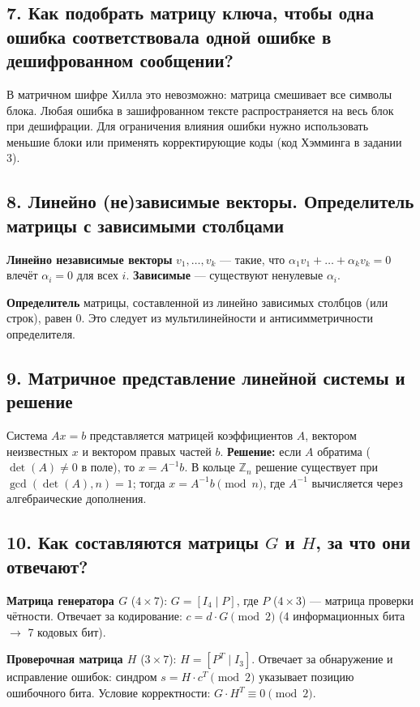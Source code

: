 \documentclass[a4paper, 12pt]{article}
\begin{document}
\subsection*{7. Как подобрать матрицу ключа, чтобы одна ошибка соответствовала одной ошибке в дешифрованном сообщении?}

В матричном шифре Хилла это невозможно: матрица смешивает все символы блока. Любая ошибка в зашифрованном тексте распространяется на весь блок при дешифрации. Для ограничения влияния ошибки нужно использовать меньшие блоки или применять корректирующие коды (код Хэмминга в задании 3).

\subsection*{8. Линейно (не)зависимые векторы. Определитель матрицы с зависимыми столбцами}

\textbf{Линейно независимые векторы} $v_1,\dots,v_k$ — такие, что $\alpha_1 v_1 + \dots + \alpha_k v_k = 0$ влечёт $\alpha_i = 0$ для всех $i$. \textbf{Зависимые} — существуют ненулевые $\alpha_i$.

\textbf{Определитель} матрицы, составленной из линейно зависимых столбцов (или строк), равен 0. Это следует из мультилинейности и антисимметричности определителя.

\subsection*{9. Матричное представление линейной системы и решение}

Система $A x = b$ представляется матрицей коэффициентов $A$, вектором неизвестных $x$ и вектором правых частей $b$. \textbf{Решение:} если $A$ обратима ($\det(A) \neq 0$ в поле), то $x = A^{-1} b$. В кольце $\mathbb{Z}_n$ решение существует при $\gcd(\det(A),n)=1$; тогда $x = A^{-1} b \pmod{n}$, где $A^{-1}$ вычисляется через алгебраические дополнения.

\subsection*{10. Как составляются матрицы $G$ и $H$, за что они отвечают?}

\textbf{Матрица генератора $G$} ($4 \times 7$): $G = [I_4 \;|\; P]$, где $P$ ($4 \times 3$) — матрица проверки чётности. Отвечает за кодирование: $c = d \cdot G \pmod{2}$ (4 информационных бита $\to$ 7 кодовых бит).

\textbf{Проверочная матрица $H$} ($3 \times 7$): $H = [P^T \;|\; I_3]$. Отвечает за обнаружение и исправление ошибок: синдром $s = H \cdot c^T \pmod{2}$ указывает позицию ошибочного бита. Условие корректности: $G \cdot H^T \equiv 0 \pmod{2}$.
\end{document}
